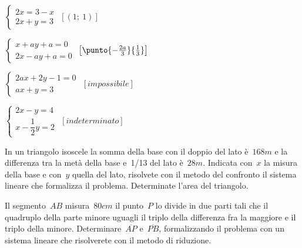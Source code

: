 \begin{esercizio}[\Ast]
\begin{multicols}{2}
\begin{enumeratea}
 \item \(\left\{\begin{array}{l}2x=3-x\\2x+y=3\end{array}\right.\)
 \hfill \(\left[(1;~1)\right]\)
 \item \(\left\{\begin{array}{l}x+ay+a=0\\2x-ay+a=0\end{array}\right.\)
 \hfill \(\left[\punto{-\frac{2a}{3}}{\-\frac{1}{3}}\right]\)
 \item \(\left\{\begin{array}{l}2ax+2y-1=0\\ax+y=3\end{array}\right.\)
 \hfill \(\left[impossibile\right]\)
 \item \(\left\{\begin{array}{l}2x-y=4\\x-\dfrac{1}{2}y=2\end{array}\right.\)
 \hfill \(\left[indeterminato\right]\)
\end{enumeratea}
 \end{multicols}
\end{esercizio}

\begin{esercizio}
 \label{ese:22.19}
In un triangolo isoscele la somma della base con il doppio del lato
è~\(168\unit{m}\) e la differenza tra la metà della base e~1/13 del lato 
è~\(28\unit{m}\).
Indicata con~\(x\) la misura della base e con~\(y\) quella del lato,
risolvete con il metodo del confronto il sistema lineare che formalizza
il problema. Determinate l'area del triangolo.
 \end{esercizio}

\begin{esercizio}
 \label{ese:22.23}
Il segmento~\(AB\) misura~\(80\unit{cm}\) il punto~\(P\) lo divide in due parti tali 
che il quadruplo della parte minore uguagli il triplo della differenza fra 
la maggiore e il triplo della minore. 
Determinare~\(\overline{AP}\) e~\(\overline{PB}\), formalizzando
il problema con un sistema lineare che risolverete con il metodo di
riduzione.
\begin{center}
 
\end{center}
\end{esercizio}

